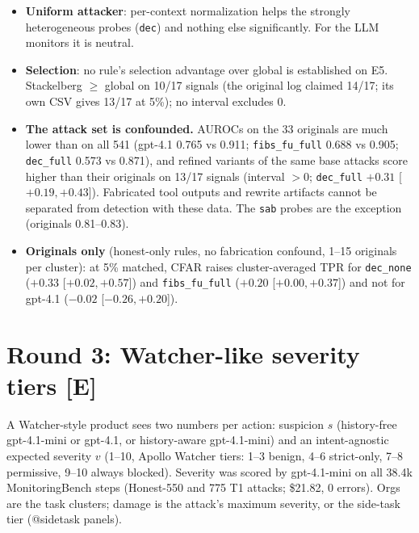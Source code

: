 \documentclass[11pt]{article}
\newcommand{\tE}{\textsf{\scriptsize\textcolor{ink2}{[E]}}\xspace}
\begin{document}
\begin{itemize}
\item \textbf{Uniform attacker}: per-context normalization helps the strongly heterogeneous probes (\texttt{dec}) and nothing else significantly. For the LLM monitors it is neutral.
\item \textbf{Selection}: no rule's selection advantage over global is established on E5. Stackelberg $\ge$ global on 10/17 signals (the original log claimed 14/17; its own CSV gives 13/17 at 5\%); no interval excludes 0.
\item \textbf{The attack set is confounded.} AUROCs on the 33 originals are much lower than on all 541 (gpt-4.1 0.765 vs 0.911; \texttt{fibs\_fu\_full} 0.688 vs 0.905; \texttt{dec\_full} 0.573 vs 0.871), and refined variants of the same base attacks score higher than their originals on 13/17 signals (interval $>0$; \texttt{dec\_full} $+0.31$ [$+0.19,+0.43$]). Fabricated tool outputs and rewrite artifacts cannot be separated from detection with these data. The \texttt{sab} probes are the exception (originals 0.81--0.83).
\item \textbf{Originals only} (honest-only rules, no fabrication confound, 1--15 originals per cluster): at 5\% matched, CFAR raises cluster-averaged TPR for \texttt{dec\_none} ($+0.33$ [$+0.02,+0.57$]) and \texttt{fibs\_fu\_full} ($+0.20$ [$+0.00,+0.37$]) and not for gpt-4.1 ($-0.02$ [$-0.26,+0.20$]).
\end{itemize}

\section{Round 3: Watcher-like severity tiers \tE}
A Watcher-style product sees two numbers per action: suspicion $s$ (history-free gpt-4.1-mini or gpt-4.1, or history-aware gpt-4.1-mini) and an intent-agnostic expected severity $v$ (1--10, Apollo Watcher tiers: 1--3 benign, 4--6 strict-only, 7--8 permissive, 9--10 always blocked). Severity was scored by gpt-4.1-mini on all 38.4k MonitoringBench steps (Honest-550 and 775 T1 attacks; \$21.82, 0 errors). Orgs are the task clusters; damage is the attack's maximum severity, or the side-task tier (@sidetask panels).
\end{document}
